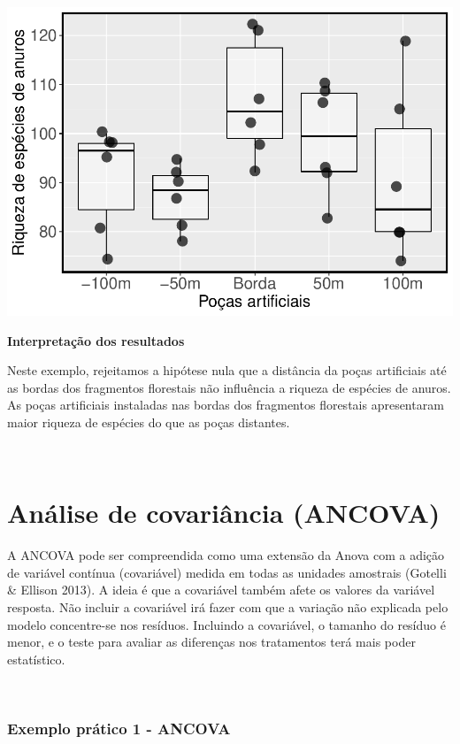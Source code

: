 \documentclass[
]{book}
\begin{document}
\includegraphics{livro_r_ecologia_files/figure-latex/unnamed-chunk-21-1.pdf}

\textbf{Interpretação dos resultados}

Neste exemplo, rejeitamos a hipótese nula que a distância da poças artificiais até as bordas dos fragmentos florestais não influência a riqueza de espécies de anuros. As poças artificiais instaladas nas bordas dos fragmentos florestais apresentaram maior riqueza de espécies do que as poças distantes.

~

\hypertarget{anuxe1lise-de-covariuxe2ncia-ancova}{%
\section{Análise de covariância (ANCOVA)}\label{anuxe1lise-de-covariuxe2ncia-ancova}}

A ANCOVA pode ser compreendida como uma extensão da Anova com a adição de variável contínua (covariável) medida em todas as unidades amostrais (Gotelli \& Ellison 2013). A ideia é que a covariável também afete os valores da variável resposta. Não incluir a covariável irá fazer com que a variação não explicada pelo modelo concentre-se nos resíduos. Incluindo a covariável, o tamanho do resíduo é menor, e o teste para avaliar as diferenças nos tratamentos terá mais poder estatístico.

~

\hypertarget{exemplo-pruxe1tico-1---ancova}{%
\subsubsection{Exemplo prático 1 - ANCOVA}\label{exemplo-pruxe1tico-1---ancova}}
\end{document}
